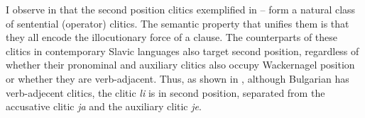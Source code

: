 \documentclass[output=paper,modfonts,newtxmath,hidelinks]{langscibook}
\begin{document}
\ea \label{11:ex9}
	\label{11:ex9a}
	\label{11:ex9b}
	\label{11:ex9c}
	\z
\z
I observe in \citet{migdalski2016} that the second position clitics exemplified in -- form a natural class of sentential (operator) clitics. The semantic property that unifies them is that they all encode the illocutionary force of a clause. The counterparts of these clitics in contemporary Slavic languages also target second position, regardless of whether their pronominal and auxiliary clitics also occupy Wackernagel position or whether they are verb-adjacent. Thus, as shown in , although Bulgarian has verb-adjecent clitics, the clitic \textit{li} is in second position, separated from the accusative clitic \textit{ja} and the auxiliary clitic \textit{je}.
\end{document}

